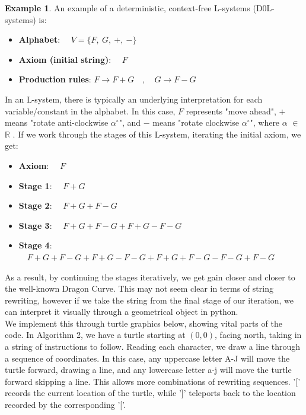 \documentclass[a4paper,11pt, titlepage]{article}
\theoremstyle{definition}
\theoremstyle{plain}
\theoremstyle{remark}
\theoremstyle{definition}
\newtheorem{example}{Example}
\begin{document}
\begin{example}
An example of a deterministic, context-free L-systems (D0L-systems) is: 

\begin{itemize}[label={}, left=0pt]
    \item \textbf{Alphabet}: \(\quad V = \{F, \ G, \ +, \ -\}\)
    \item \textbf{Axiom (initial string)}: \(\quad F\)
    \item \textbf{Production rules}: \(F \rightarrow F + G \quad, \quad G \rightarrow F - G\)

\end{itemize}

In an L-system, there is typically an underlying interpretation for each variable/constant in the alphabet. In this case, \( F \) represents "move ahead", \( + \) means "rotate anti-clockwise \(\alpha^\circ\)", and \( - \) means "rotate clockwise \(\alpha^\circ\)", where \(\alpha\) \(\in\) \(\mathbb{R}\) . If we work through the stages of this L-system, iterating the initial axiom, we get:


\begin{itemize}[label={}, left=0pt, align=left, itemsep=0pt, parsep=0pt, topsep=0pt]
    \item \textbf{Axiom}: \(\quad F\)
    \item \textbf{Stage 1}: \(\quad F+G\)
    \item \textbf{Stage 2}: \(\quad F+G+F-G\)
    \item \textbf{Stage 3}: \(\quad F+G+F-G+F+G-F-G\)
    \item \textbf{Stage 4}: \(\quad F+G+F-G+F+G-F-G+F+G+F-G-F-G+F-G\)
\end{itemize}
\end{example}

As a result, by continuing the stages iteratively, we get gain closer and closer to the well-known Dragon Curve. This may not seem clear in terms of string rewriting, however if we take the string from the final stage of our iteration, we can interpret it visually through a geometrical object in python.\\
We implement this through turtle graphics below, showing vital parts of the code. In Algorithm 2, we have a turtle starting at $(0,0)$, facing north, taking in a string of instructions to follow. Reading each character, we draw a line through a sequence of coordinates. In this case, any uppercase letter A-J will move the turtle forward, drawing a line, and any lowercase letter a-j will move the turtle forward skipping a line. This allows more combinations of rewriting sequences. '[' records the current location of the turtle, while ']' teleports back to the location recorded by the corresponding '['.
\end{document}
